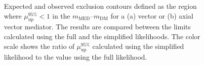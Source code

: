 \begin{figure}[hbt!]
  \begin{center} 
   \caption{Expected and observed exclusion contours defined as the region where $\mu_{\mathrm{up}}^{95\%}\lt1$ in the $m_{\mathrm{MED}}$--$m_{\mathrm{DM}}$ 
   for a (a) vector or (b) axial vector mediator. The results 
   are compared between the limits calculated using the full and the simplified likelihoods. The color scale shows the ratio of $\mu_{\mathrm{up}}^{95\%}$ calculated 
   using the simplified likelihood to the value using the full likelihood.}
   \label{fig:masslims} 
  \end{center}
\end{figure}

